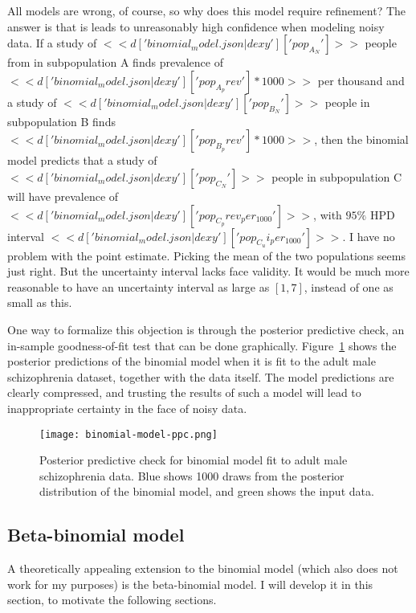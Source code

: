 All models are wrong, of course, so why does this model require
refinement? The answer is that is leads to unreasonably high
confidence when modeling noisy data.  If a study of
$<<d['binomial_model.json|dexy']['pop_A_N']>>$ people from in
subpopulation A finds prevalence of
$<<d['binomial_model.json|dexy']['pop_A_prev']*1000>>$ per thousand and
a study of $<<d['binomial_model.json|dexy']['pop_B_N']>>$ people in
subpopulation B finds $<<
d['binomial_model.json|dexy']['pop_B_prev']*1000 >>$, then the
binomial model predicts that a study of
$<<d['binomial_model.json|dexy']['pop_C_N']>>$ people in subpopulation
C will have prevalence of
$<<d['binomial_model.json|dexy']['pop_C_prev_per_1000']>>$, with
$95\%$ HPD interval
$<<d['binomial_model.json|dexy']['pop_C_ui_per_1000']>>$.  I have
no problem with the point estimate.  Picking the mean of the two
populations seems just right.  But the uncertainty interval lacks face
validity.  It would be much more reasonable to have an uncertainty
interval as large as $[1,7]$, instead of one as small as this.

One way to formalize this objection is through the posterior
predictive check, an in-sample goodness-of-fit test that can be done
graphically.  Figure~\ref{fig:theory-rate_model-binom_ppc} shows the
posterior predictions of the binomial model when it is fit to the
adult male schizophrenia dataset, together with the data itself.  The
model predictions are clearly compressed, and trusting the results of
such a model will lead to inappropriate certainty in the face of noisy
data.

\begin{figure}[ht]
\begin{center}
\texttt{[image: binomial-model-ppc.png]}
\end{center}
\caption{Posterior predictive check for binomial model fit to adult
  male schizophrenia data.  Blue shows 1000 draws from the posterior
  distribution of the binomial model, and green shows the input data.}
\label{fig:theory-rate_model-binom_ppc}
\end{figure}




\subsection{Beta-binomial model}
A theoretically appealing extension to the binomial model (which also
does not work for my purposes) is the beta-binomial model.  I will
develop it in this section, to motivate the following sections.

